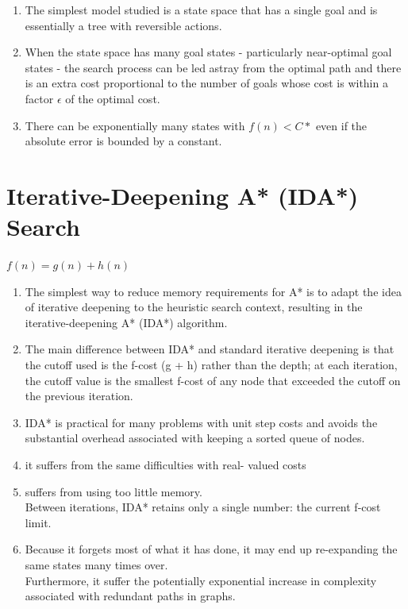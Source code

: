 \begin{enumerate}
    \item The simplest model studied is a state space that has a single goal and is essentially a tree with reversible actions.

    \item When the state space has many goal states - particularly near-optimal goal states - the search process can be led astray from the optimal path and there is an extra cost proportional to the number of goals whose cost is within a factor $\epsilon$ of the optimal cost.

    \item There can be exponentially many states with $f(n) < C*$ even if the absolute error is bounded by a constant.

    
\end{enumerate}




\section{Iterative-Deepening A* (IDA*) Search \cite{aci-1}} \label{Iterative-Deepening A* (IDA*) Search}

\begin{center}
    $f(n) = g(n)+h(n)$
\end{center}

\begin{enumerate}
    \item The simplest way to reduce memory requirements for A* is to adapt the idea of iterative deepening to the heuristic search context, resulting in the iterative-deepening A* (IDA*) algorithm. 
    
    \item The main difference between IDA* and standard iterative deepening is that the cutoff used is the f-cost (g + h) rather than the depth; at each iteration, the cutoff value is the smallest f-cost of any node that exceeded the cutoff on the previous iteration.

    \item IDA* is practical for many problems with unit step costs and avoids the substantial overhead associated with keeping a sorted queue of nodes.

    \item it suffers from the same difficulties with real- valued costs

    \item suffers from using too little memory.\\
    Between iterations, IDA* retains only a single number: the current f-cost limit.

    \item Because it forgets most of what it has done, it may end up re-expanding the same states many times over. \\
    Furthermore, it suffer the potentially exponential increase in complexity associated with redundant paths in graphs.
\end{enumerate}


